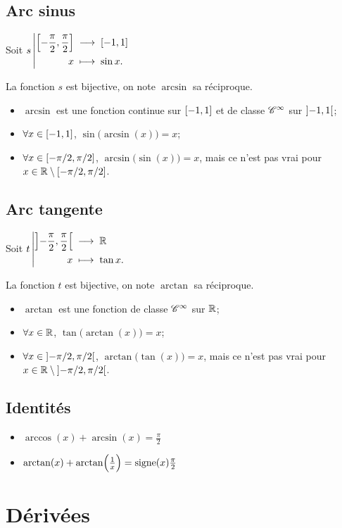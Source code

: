 \documentclass{yann}
\DeclareMathOperator\Signe{signe}
\begin{document}
\subsection{Arc sinus}

Soit ${s}\left|\begin{aligned}{\left[ -\frac\pi2,\frac\pi2 \right]}&\;\longrightarrow\;{\mathopen[-1,1\mathclose]}\\{x}&\;\longmapsto\;{\sin x.}\end{aligned}\right.$

La fonction $s$ est bijective, on note $\arcsin$ sa réciproque.

\begin{itemize}
\item
$\arcsin$ est une fonction continue sur $\mathopen[-1,1\mathclose]$
et de classe $\mathscr{C}^{\infty}$ sur $\mathopen]-1,1\mathclose[$;
\item
$\forall x\in\mathopen[-1,1\mathclose]$, $\sin\bigl( \arcsin(x) \bigr) = x$;
\item
$\forall x\in\mathopen[-\pi/2,\pi/2\mathclose]$, $\arcsin\bigl( \sin(x) \bigr) = x$,
mais ce n'est pas vrai pour $x\in\mathbb{R}\setminus\mathopen[-\pi/2,\pi/2\mathclose]$.
\end{itemize}

\subsection{Arc tangente}

Soit ${t}\left|\begin{aligned}{\left] -\frac\pi2,\frac\pi2 \right[}&\;\longrightarrow\;{\mathbb{R}}\\{x}&\;\longmapsto\;{\tan x.}\end{aligned}\right.$

La fonction $t$ est bijective, on note $\arctan$ sa réciproque.

\begin{itemize}
\item
$\arctan$ est une fonction de classe $\mathscr{C}^{\infty}$ sur $\mathbb{R}$;
\item
$\forall x\in\mathbb{R}$, $\tan\bigl( \arctan(x) \bigr) = x$;
\item
$\forall x\in\mathopen]-\pi/2,\pi/2\mathclose[$, $\arctan\bigl( \tan(x) \bigr) = x$,
mais ce n'est pas vrai pour $x\in\mathbb{R}\setminus\mathopen]-\pi/2,\pi/2\mathclose[$.
\end{itemize}

\subsection{Identités}

\begin{itemize}
\item
$\arccos(x) + \arcsin(x)       =  \frac\pi2$
\item
$\arctan(x) + \arctan\BigPa{\frac1x} =  \Signe(x)\frac\pi2$
\end{itemize}

\section{Dérivées}
\end{document}
